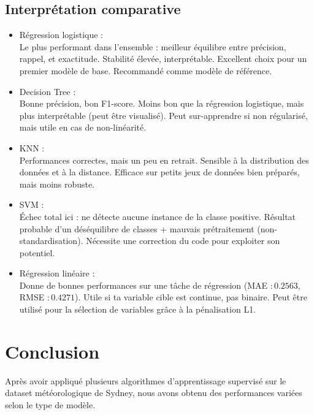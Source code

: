 \documentclass[a4paper,11pt]{article}
\begin{document}
	\subsection{Interprétation comparative}
	\begin{itemize}
		\item Régression logistique : \\
		Le plus performant dans l’ensemble : meilleur équilibre entre précision, rappel, et exactitude.
		Stabilité élevée, interprétable.
		Excellent choix pour un premier modèle de base.
		Recommandé comme modèle de référence.
		
		\item   Decision Tree :\\
		Bonne précision, bon F1-score.
		Moins bon que la régression logistique, mais plus interprétable (peut être visualisé).
		Peut sur-apprendre si non régularisé, mais utile en cas de non-linéarité.
		
		\item   KNN :\\
		Performances correctes, mais un peu en retrait.
		Sensible à la distribution des données et à la distance.
		Efficace sur petits jeux de données bien préparés, mais moins robuste.
		
		\newpage
		\item   SVM :\\
		Échec total ici : ne détecte aucune instance de la classe positive.
		Résultat probable d’un déséquilibre de classes + mauvais prétraitement (non-standardisation).
		Nécessite une correction du code pour exploiter son potentiel.
		
		\item  Régression linéaire :\\
		Donne de bonnes performances sur une tâche de régression (MAE $: 0.2563$, RMSE $: 0.4271$).
		Utile si ta variable cible est continue, pas binaire.
		Peut être utilisé pour la sélection de variables grâce à la pénalisation L1.
		
	\end{itemize}
	\newpage
	\vspace{1.5cm}
	\section{Conclusion}
	\indent
	Après avoir appliqué plusieurs algorithmes d’apprentissage supervisé sur le dataset météorologique de Sydney, nous avons obtenu des performances variées selon le type de modèle.\\
	
\end{document}
